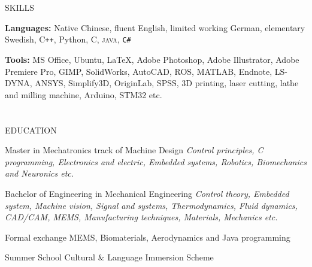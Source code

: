 \documentclass{my_cv}
\begin{document}
\begin{multicols}{2}
\section{\faList}{SKILLS}

\textbf{Languages:} Native Chinese, fluent English, limited working German, elementary Swedish, C\texttt{++}, Python, C, \textsc{java}, \texttt{C\#}

\noindent\textbf{Tools:} MS Office, Ubuntu, \LaTeX, Adobe Photoshop, Adobe Illustrator, Adobe Premiere Pro, GIMP, SolidWorks, AutoCAD, ROS, MATLAB, Endnote, LS-DYNA, ANSYS, Simplify3D, OriginLab, SPSS, 3D printing, laser cutting, lathe and milling machine, Arduino, STM32 etc.

\columnbreak



\section{\faGraduationCap}{EDUCATION}
    
{Master in Mechatronics track of Machine Design} %
{\textit{Control principles, C programming, Electronics and electric, Embedded systems, Robotics, Biomechanics and Neuronics etc.}}
    
{Bachelor of Engineering in Mechanical Engineering} %
{\textit{Control theory, Embedded system, Machine vision, Signal and systems, Thermodynamics, Fluid dynamics, CAD/CAM, MEMS, Manufacturing techniques, Materials, Mechanics etc.}}

{Formal exchange} %
{MEMS, Biomaterials, Aerodynamics and Java programming}

{Summer School} %
{Cultural \& Language Immersion Scheme}


\end{multicols}
\end{document}
